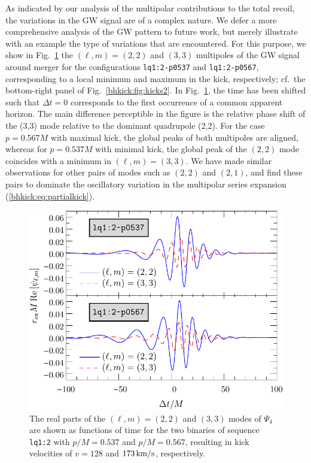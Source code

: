 As indicated by our analysis of the multipolar contributions
to the total recoil, the variations in the GW signal are of a
complex nature. We defer a more comprehensive analysis of
the GW pattern to future work, but merely illustrate with an 
example the type of variations that are encountered.
For this purpose, we show in Fig.~\ref{bhkick:fig:psi4modes}
the $(\ell,m)=(2,2)$ and $(3,3)$ multipoles of the
GW signal around merger for the configurations \texttt{lq1:2-p0537} 
and \texttt{lq1:2-p0567}, corresponding to a local minimum and 
maximum in the
kick, respectively; cf.~the bottom-right panel of Fig.~\ref{bhkick:fig:kicks2}. In Fig.~\ref{bhkick:fig:psi4modes},
the time has been shifted such that $\Delta t =0$ corresponds
to the first occurrence of a common apparent horizon. The main
difference perceptible in the figure is the relative phase shift of
the (3,3) mode relative to the dominant quadrupole (2,2). For the
case $p=0.567M$ with maximal kick, the global peaks of both multipoles
are aligned, whereas for $p=0.537M$ with minimal kick, the global peak
of the $(2,2)$ mode coincides with a minimum in $(\ell,m)=(3,3)$. We
have made similar observations for other pairs of modes such as
$(2,2)$ and $(2,1)$, and find these pairs to dominate the oscillatory
variation in the multipolar series expansion (\ref{bhkick:eq:partialkick}).
%
\begin{figure}[t]
    \centering
    \includegraphics[width=0.7\columnwidth,clip=true]{bhkick/mode-kick-extrema.pdf}    
    \caption{The real parts of the $(\ell,m)=(2,2)$ and $(3,3)$ modes of $\Psi_4$
             are shown as functions of time for the two binaries
             of sequence \texttt{lq1:2} with $p/M=0.537$ and $p/M=0.567$,
             resulting in kick velocities of $v = 128$
             and $173\,{\rm km/s}$, respectively.
            }
             \label{bhkick:fig:psi4modes}
\end{figure}
%



